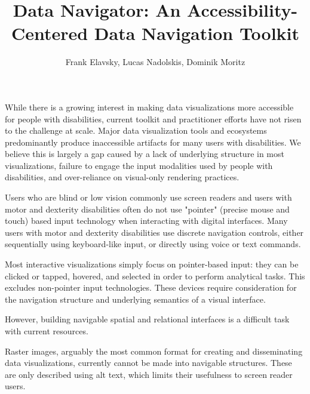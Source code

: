 \documentclass[journal]{vgtc}                %
\title{Data Navigator: An Accessibility-Centered Data Navigation Toolkit}
\author{Frank Elavsky, Lucas Nadolskis, Dominik Moritz}
\begin{document}




\maketitle

While there is a growing interest in making data visualizations more accessible for people with disabilities, current toolkit and practitioner efforts have not risen to the challenge at scale. Major data visualization tools and ecosystems predominantly produce inaccessible artifacts for many users with disabilities. We believe this is largely a gap caused by a lack of underlying structure in most visualizations, failure to engage the input modalities used by people with disabilities, and over-reliance on visual-only rendering practices.

Users who are blind or low vision commonly use screen readers and users with motor and dexterity disabilities often do not use "pointer" (precise mouse and touch) based input technology when interacting with digital interfaces. Many users with motor and dexterity disabilities use discrete navigation controls, either sequentially using keyboard-like input, or directly using voice or text commands.

Most interactive visualizations simply focus on pointer-based input: they can be clicked or tapped, hovered, and selected in order to perform analytical tasks. This excludes non-pointer input technologies. These devices require consideration for the navigation structure and underlying semantics of a visual interface.

However, building navigable spatial and relational interfaces is a difficult task with current resources.

Raster images, arguably the most common format for creating and disseminating data visualizations, currently cannot be made into navigable structures. These are only described using alt text, which limits their usefulness to screen reader users.
\end{document}
